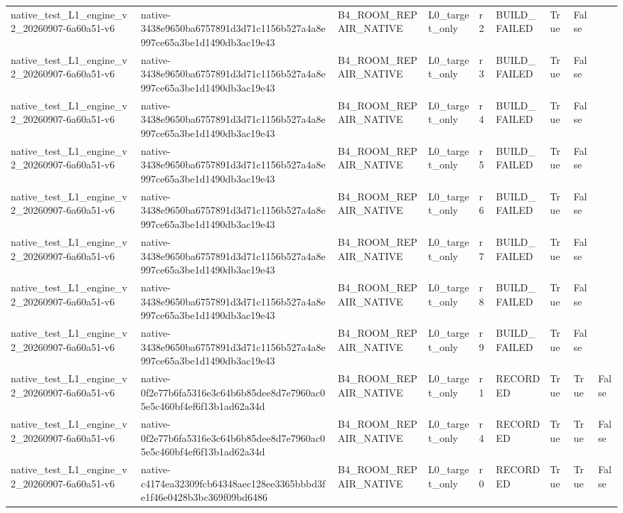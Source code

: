 \begin{tabular}{lllllllll}
native\_test\_L1\_engine\_v2\_20260907-6a60a51-v6 & native-3438e9650ba6757891d3d71c1156b527a4a8e997ce65a3be1d1490db3ac19e43 & B4\_ROOM\_REPAIR\_NATIVE & L0\_target\_only & r2 & BUILD\_FAILED & True & False &  \\
native\_test\_L1\_engine\_v2\_20260907-6a60a51-v6 & native-3438e9650ba6757891d3d71c1156b527a4a8e997ce65a3be1d1490db3ac19e43 & B4\_ROOM\_REPAIR\_NATIVE & L0\_target\_only & r3 & BUILD\_FAILED & True & False &  \\
native\_test\_L1\_engine\_v2\_20260907-6a60a51-v6 & native-3438e9650ba6757891d3d71c1156b527a4a8e997ce65a3be1d1490db3ac19e43 & B4\_ROOM\_REPAIR\_NATIVE & L0\_target\_only & r4 & BUILD\_FAILED & True & False &  \\
native\_test\_L1\_engine\_v2\_20260907-6a60a51-v6 & native-3438e9650ba6757891d3d71c1156b527a4a8e997ce65a3be1d1490db3ac19e43 & B4\_ROOM\_REPAIR\_NATIVE & L0\_target\_only & r5 & BUILD\_FAILED & True & False &  \\
native\_test\_L1\_engine\_v2\_20260907-6a60a51-v6 & native-3438e9650ba6757891d3d71c1156b527a4a8e997ce65a3be1d1490db3ac19e43 & B4\_ROOM\_REPAIR\_NATIVE & L0\_target\_only & r6 & BUILD\_FAILED & True & False &  \\
native\_test\_L1\_engine\_v2\_20260907-6a60a51-v6 & native-3438e9650ba6757891d3d71c1156b527a4a8e997ce65a3be1d1490db3ac19e43 & B4\_ROOM\_REPAIR\_NATIVE & L0\_target\_only & r7 & BUILD\_FAILED & True & False &  \\
native\_test\_L1\_engine\_v2\_20260907-6a60a51-v6 & native-3438e9650ba6757891d3d71c1156b527a4a8e997ce65a3be1d1490db3ac19e43 & B4\_ROOM\_REPAIR\_NATIVE & L0\_target\_only & r8 & BUILD\_FAILED & True & False &  \\
native\_test\_L1\_engine\_v2\_20260907-6a60a51-v6 & native-3438e9650ba6757891d3d71c1156b527a4a8e997ce65a3be1d1490db3ac19e43 & B4\_ROOM\_REPAIR\_NATIVE & L0\_target\_only & r9 & BUILD\_FAILED & True & False &  \\
native\_test\_L1\_engine\_v2\_20260907-6a60a51-v6 & native-0f2e77b6fa5316e3c64b6b85dee8d7e7960ac05e5c460bf4ef6f13b1ad62a34d & B4\_ROOM\_REPAIR\_NATIVE & L0\_target\_only & r1 & RECORDED & True & True & False \\
native\_test\_L1\_engine\_v2\_20260907-6a60a51-v6 & native-0f2e77b6fa5316e3c64b6b85dee8d7e7960ac05e5c460bf4ef6f13b1ad62a34d & B4\_ROOM\_REPAIR\_NATIVE & L0\_target\_only & r4 & RECORDED & True & True & False \\
native\_test\_L1\_engine\_v2\_20260907-6a60a51-v6 & native-c4174ea32309fcb64348aec128ee3365bbbd3fe1f46e0428b3bc369f09bd6486 & B4\_ROOM\_REPAIR\_NATIVE & L0\_target\_only & r0 & RECORDED & True & True & False \\

\end{tabular}
